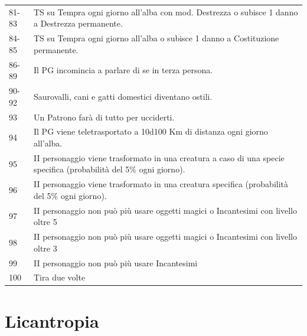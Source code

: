 \begin{tabularx}{\linewidth}{lX}
\rowcolor{gray!20}81-83 & TS su Tempra ogni giorno all'alba con mod. Destrezza o subisce 1 danno a Destrezza permanente.\\
84-85 & TS su Tempra ogni giorno all'alba o subisce 1 danno a Costituzione permanente.\\
\rowcolor{gray!20}86-89& Il PG incomincia a parlare di se in terza persona.\\
90-92& Saurovalli, cani e gatti domestici diventano ostili.\\
\rowcolor{gray!20}93& Un Patrono farà di tutto per ucciderti.\\
94& Il PG viene teletrasportato a 10d100 Km di distanza ogni giorno all'alba.\\
\rowcolor{gray!20}95& II personaggio viene trasformato in una creatura a caso di una specie specifica (probabilità del 5\% ogni giorno).\\
96& II personaggio viene trasformato in una creatura specifica (probabilità del 5\% ogni giorno).\\
\rowcolor{gray!20}97& II personaggio non può più usare oggetti magici o Incantesimi con livello oltre 5\\
98& II personaggio non può più usare oggetti magici o Incantesimi con livello oltre 3\\
\rowcolor{gray!20}99& II personaggio non può più usare Incantesimi\\
100 & Tira due volte
\end{tabularx}

\pagebreak

\section*{Licantropia}\label{Licantropia}\hypertarget{Licantropia}{}


